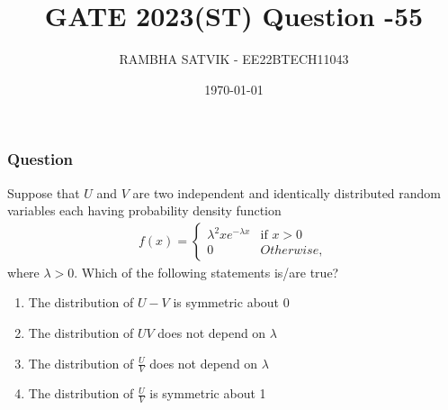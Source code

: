 \documentclass{beamer}
\title{GATE 2023(ST) Question -55}
\author{RAMBHA SATVIK - EE22BTECH11043}
\institute{EE2102 - IITH}
\date{\today}
\begin{document}
\begin{frame}
\titlepage
\end{frame}

\begin{frame}
\frametitle{Question}
Suppose that $U$ and $V$ are two independent and identically distributed random
variables each having probability density function
\begin{align}
f(x) = 
\begin{cases}
\lambda^{2}xe^{-\lambda x} & \text{if } x > 0\\
0 & Otherwise,
\end{cases}
\end{align}
where $\lambda > 0$. Which of the following statements is/are true?
\begin{enumerate}
\item The distribution of $U-V$ is symmetric about 0
\item The distribution of $UV$ does not depend on $\lambda$
\item The distribution of $\frac{U}{V}$ does not depend on $\lambda$
\item The distribution of $\frac{U}{V}$ is symmetric about 1
\end{enumerate}
\end{frame}
\end{document}

